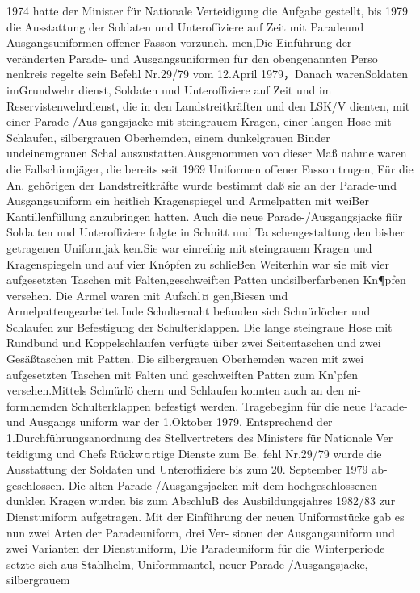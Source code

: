 

1974 hatte der Minister für Nationale Verteidigung
die Aufgabe gestellt, bis 1979 die Ausstattung der
Soldaten und Unteroffiziere auf Zeit mit Paradeund Ausgangsuniformen offener Fasson vorzuneh.
men,Die Einführung der veränderten Parade- und
Ausgangsuniformen für den obengenannten Perso
nenkreis regelte sein Befehl Nr.29/79 vom 12.April
1979，Danach warenSoldaten imGrundwehr
dienst, Soldaten und Unteroffiziere auf Zeit und im
Reservistenwehrdienst, die in den Landstreitkräften
und den LSK/V dienten, mit einer Parade-/Aus
gangsjacke mit steingrauem Kragen, einer langen
Hose mit Schlaufen, silbergrauen Oberhemden,
einem dunkelgrauen Binder undeinemgrauen
Schal auszustatten.Ausgenommen von dieser Maß
nahme waren die Fallschirmjäger, die bereits seit
1969 Uniformen offener Fasson trugen, Für die An.
gehörigen der Landstreitkräfte wurde bestimmt
daß sie an der Parade-und Ausgangsuniform ein
heitlich Kragenspiegel und Armelpatten mit weiBer
Kantillenfüllung anzubringen hatten.
Auch die neue Parade-/Ausgangsjacke fiür Solda
ten und Unteroffiziere folgte in Schnitt und Ta
schengestaltung den bisher getragenen Uniformjak
ken.Sie war einreihig mit steingrauem Kragen und
Kragenspiegeln und auf vier Knópfen zu schlieBen
Weiterhin war sie mit vier aufgesetzten Taschen mit
Falten,geschweiften Patten undsilberfarbenen
Kn¶pfen versehen. Die Armel waren mit Aufschl¤
gen,Biesen und Armelpattengearbeitet.Inde
Schulternaht befanden sich Schnürlöcher und
Schlaufen zur Befestigung der Schulterklappen.
Die lange steingraue Hose mit Rundbund und
Koppelschlaufen verfügte üiber zwei Seitentaschen
und zwei Gesäßtaschen mit Patten.
Die silbergrauen Oberhemden waren mit zwei
aufgesetzten Taschen mit Falten und geschweiften
Patten zum Kn'pfen versehen.Mittels Schnürlö
chern und Schlaufen konnten auch an den ni-
formhemden Schulterklappen befestigt werden.
Tragebeginn für die neue Parade- und Ausgangs
uniform war der 1.Oktober 1979.
Entsprechend der 1.Durchführungsanordnung
des Stellvertreters des Ministers für Nationale Ver
teidigung und Chefs Rückw¤rtige Dienste zum Be.
fehl Nr.29/79 wurde die Ausstattung der Soldaten und Unteroffiziere bis zum 20. September 1979 ab-
geschlossen. Die alten Parade-/Ausgangsjacken mit
dem hochgeschlossenen dunklen Kragen wurden
bis zum AbschluB des Ausbildungsjahres 1982/83
zur Dienstuniform aufgetragen.
Mit der Einführung der neuen Uniformstücke
gab es nun zwei Arten der Paradeuniform, drei Ver-
sionen der Ausgangsuniform und zwei Varianten
der Dienstuniform, Die Paradeuniform für die
Winterperiode setzte sich aus Stahlhelm, Uniformmantel, neuer Parade-/Ausgangsjacke, silbergrauem
